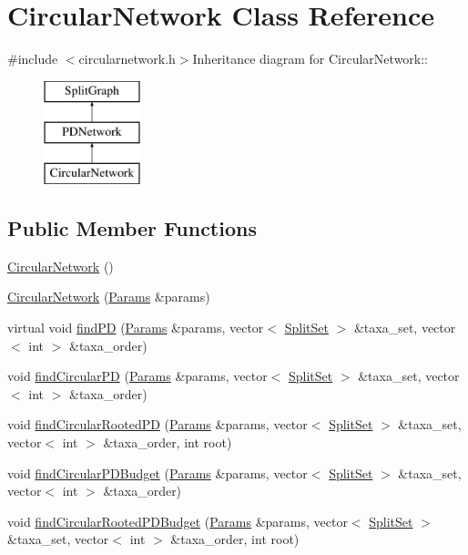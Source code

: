 \hypertarget{classCircularNetwork}{
\section{CircularNetwork Class Reference}
\label{classCircularNetwork}
}


{\ttfamily \#include $<$circularnetwork.h$>$}Inheritance diagram for CircularNetwork::\begin{figure}[H]
\begin{center}
\leavevmode
\includegraphics[height=3cm]{classCircularNetwork}
\end{center}
\end{figure}
\subsection*{Public Member Functions}
\begin{DoxyCompactItemize}
\item 
\hyperlink{classCircularNetwork_acc7bc17d879498a780501e2a0bdaec03}{CircularNetwork} ()
\item 
\hyperlink{classCircularNetwork_acdd16c31a1ef6cdcbfeaf60d71e8b47e}{CircularNetwork} (\hyperlink{structParams}{Params} \&params)
\item 
virtual void \hyperlink{classCircularNetwork_a2d7a229ba82a87667c7f194249484f38}{findPD} (\hyperlink{structParams}{Params} \&params, vector$<$ \hyperlink{classSplitSet}{SplitSet} $>$ \&taxa\_\-set, vector$<$ int $>$ \&taxa\_\-order)
\item 
void \hyperlink{classCircularNetwork_a366581f42f10893f5a804073163e609c}{findCircularPD} (\hyperlink{structParams}{Params} \&params, vector$<$ \hyperlink{classSplitSet}{SplitSet} $>$ \&taxa\_\-set, vector$<$ int $>$ \&taxa\_\-order)
\item 
void \hyperlink{classCircularNetwork_af1ee858ebbe97abd3296cad55590f24a}{findCircularRootedPD} (\hyperlink{structParams}{Params} \&params, vector$<$ \hyperlink{classSplitSet}{SplitSet} $>$ \&taxa\_\-set, vector$<$ int $>$ \&taxa\_\-order, int root)
\item 
void \hyperlink{classCircularNetwork_a5fe3bf80c02888d7cacf87a04c041651}{findCircularPDBudget} (\hyperlink{structParams}{Params} \&params, vector$<$ \hyperlink{classSplitSet}{SplitSet} $>$ \&taxa\_\-set, vector$<$ int $>$ \&taxa\_\-order)
\item 
void \hyperlink{classCircularNetwork_ae661db891b7746f63444cb221df89e68}{findCircularRootedPDBudget} (\hyperlink{structParams}{Params} \&params, vector$<$ \hyperlink{classSplitSet}{SplitSet} $>$ \&taxa\_\-set, vector$<$ int $>$ \&taxa\_\-order, int root)
\end{DoxyCompactItemize}
